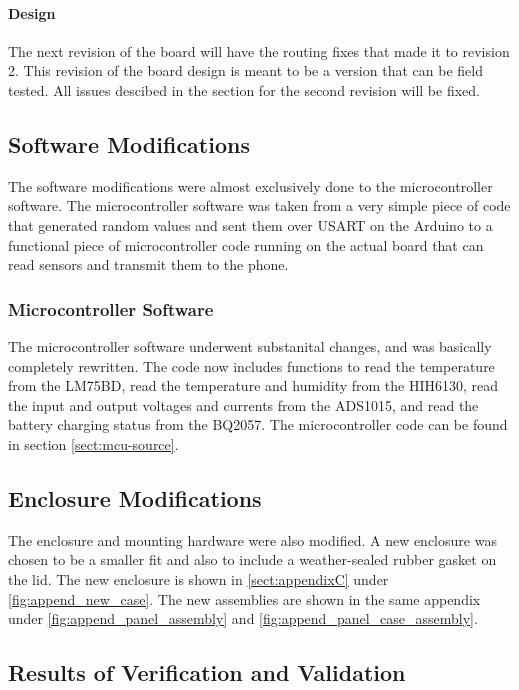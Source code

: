 \documentclass{article}
\numberwithin{figure}{section}
\numberwithin{equation}{section}
\begin{document}
{\paragraph{Design}
The next revision of the board will have the routing fixes that made it to revision 2. This revision of the board design is meant to be a version that can be field tested. All issues descibed in the section for the second revision will be fixed.
\subsection{Software Modifications}\label{conclusion-software}
The software modifications were almost exclusively done to the microcontroller software. The microcontroller software was taken from a very simple piece of code that generated random values and sent them over USART on the Arduino to a functional piece of microcontroller code running on the actual board that can read sensors and transmit them to the phone.
\subsubsection{Microcontroller Software}\label{conclusion-mcu-software}
The microcontroller software underwent substanital changes, and was basically completely rewritten. The code now includes functions to read the temperature from the LM75BD, read the temperature and humidity from the HIH6130, read the input and output voltages and currents from the ADS1015, and read the battery charging status from the BQ2057. The microcontroller code can be found in section \ref{sect:mcu-source}.

\subsection{Enclosure Modifications}\label{conclusion-enclosure}
The enclosure and mounting hardware were also modified. A new enclosure was chosen to be a smaller fit and also to include a weather-sealed rubber gasket on the lid. The new enclosure is shown in \ref{sect:appendixC} under \ref{fig:append_new_case}. The new assemblies are shown in the same appendix under \ref{fig:append_panel_assembly} and \ref{fig:append_panel_case_assembly}.

\subsection{Results of Verification and Validation}\label{conclusion-vv}

}
\end{document}
